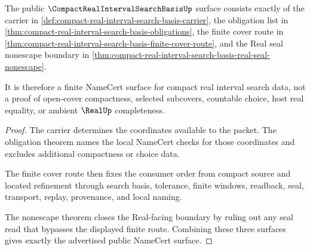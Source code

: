 \begin{theorem}
\label{thm:compact-real-interval-search-basis-namecert-surface}
The public $\CompactRealIntervalSearchBasisUp$ surface consists exactly of the carrier in \autoref{def:compact-real-interval-search-basis-carrier}, the obligation list in \autoref{thm:compact-real-interval-search-basis-obligations}, the finite cover route in \autoref{thm:compact-real-interval-search-basis-finite-cover-route}, and the Real seal nonescape boundary in \autoref{thm:compact-real-interval-search-basis-real-seal-nonescape}.

It is therefore a finite NameCert surface for compact real interval search data, not a proof of open-cover compactness, selected subcovers, countable choice, host real equality, or ambient $\RealUp$ completeness.
\end{theorem}
\begin{proof}
The carrier determines the coordinates available to the packet. The obligation theorem names the local NameCert checks for those coordinates and excludes additional compactness or choice data.

The finite cover route then fixes the consumer order from compact source and located refinement through search basis, tolerance, finite windows, readback, seal, transport, replay, provenance, and local naming.

The nonescape theorem closes the Real-facing boundary by ruling out any seal read that bypasses the displayed finite route. Combining these three surfaces gives exactly the advertised public NameCert surface.
\end{proof}



